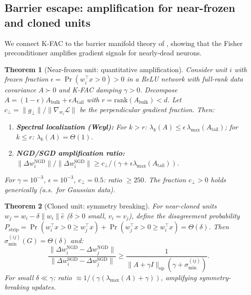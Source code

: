 \documentclass{article}
\newtheorem{theorem}{Theorem}
\newcommand{\cL}{\mathcal{L}}
\begin{document}
\subsection{Barrier escape: amplification for near-frozen and cloned units}
\label{sec:barrier}

We connect K-FAC to the barrier manifold theory of \citet{joudaki2026barriers}, showing that the Fisher preconditioner amplifies gradient signals for nearly-dead neurons.

\begin{theorem}[Near-frozen unit: quantitative amplification]
\label{thm:barrier}
Consider unit $i$ with frozen fraction $\epsilon = \Pr(w_i^\top x > 0) > 0$ in a ReLU network with full-rank data covariance $A \succ 0$ and K-FAC damping $\gamma > 0$. Decompose $A = (1-\epsilon)A_{\mathrm{bulk}} + \epsilon A_{\mathrm{tail}}$ with $r = \mathrm{rank}(A_{\mathrm{bulk}}) < d$. Let $c_\perp = \|g_\perp\|/\|\nabla_{w_i}\cL\|$ be the perpendicular gradient fraction. Then:
\begin{enumerate}[nosep]
    \item \textbf{Spectral localization (Weyl):} For $k > r$: $\lambda_k(A) \leq \epsilon\,\lambda_{\max}(A_{\mathrm{tail}})$; for $k \leq r$: $\lambda_k(A) = \Theta(1)$.
    \item \textbf{NGD/SGD amplification ratio:} $\|\Delta w_i^{\mathrm{NGD}}\|/\|\Delta w_i^{\mathrm{SGD}}\| \geq c_\perp/(\gamma + \epsilon\lambda_{\max}(A_{\mathrm{tail}}))$.
\end{enumerate}
For $\gamma = 10^{-3}$, $\epsilon = 10^{-3}$, $c_\perp = 0.5$: ratio $\geq 250$. The fraction $c_\perp > 0$ holds generically (a.s.\ for Gaussian data).
\end{theorem}

\begin{theorem}[Cloned unit: symmetry breaking]
\label{thm:clone}
For near-cloned units $w_j = w_i - \delta\|w_i\|\hat{e}$ ($\delta > 0$ small, $v_i = v_j$), define the disagreement probability $P_{\mathrm{strip}} = \Pr(w_i^\top x > 0 \geq w_j^\top x) + \Pr(w_j^\top x > 0 \geq w_i^\top x) = \Theta(\delta)$. Then $\sigma_{\min}^{(ij)}(G) = \Theta(\delta)$ and:
\[
\frac{\|\Delta w_i^{\mathrm{NGD}} - \Delta w_j^{\mathrm{NGD}}\|}{\|\Delta w_i^{\mathrm{SGD}} - \Delta w_j^{\mathrm{SGD}}\|} \geq \frac{1}{\|A+\gamma I\|_{\mathrm{op}}(\gamma + \sigma_{\min}^{(ij)})}.
\]
For small $\delta \ll \gamma$: ratio $\approx 1/(\gamma(\lambda_{\max}(A)+\gamma))$, amplifying symmetry-breaking updates.
\end{theorem}
\end{document}
